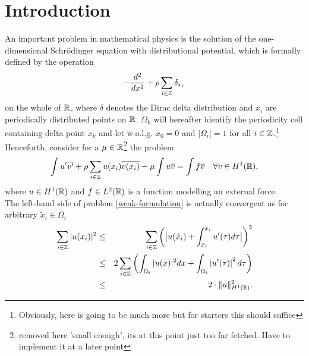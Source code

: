 \chapter{Introduction}

An important problem in mathematical physics is the solution of the one-dimensional Schrödinger equation with distributional potential, which is formally defined by the operation
\begin{equation}
	- \frac{d^{2}}{dx^{2}} + \rho \sum_{i \in \mathbb{Z}} \delta_{x_{i}} \label{the-operator}
\end{equation}
on the whole of $\mathbb{R}$, where $\delta$ denotes the Dirac delta distribution and $x_{i}$ are periodically distributed points on $\mathbb{R}$. $\Omega_{k}$ will hereafter identify the periodicity cell containing delta point $x_{k}$ and let w.o.l.g. $x_{0} = 0$ and $|\Omega_{i}| = 1$ for all $i \in \mathbb{Z}$.\footnote{Obviously, here is going to be much more but for starters this should suffice} \\

Henceforth, consider for a $\mu \in \mathbb{R}$\footnote{removed here 'small enough', its at this point just too far fetched. Have to implement it at a later point} the problem
\begin{equation}
	\int u' \overline{v'} + \rho \sum_{i \in \mathbb{Z}} u(x_{i}) \overline{v(x_{i})} - \mu \int u \overline{v} = \int f \overline{v} \quad \forall v \in H^{1}(\mathbb{R}), \label{weak-formulation}
\end{equation}	
where $u \in H^{1}(\mathbb{R})$ and $f \in L^{2}(\mathbb{R})$ is a function modelling an external force. \\	
The left-hand side of problem \eqref{weak-formulation} is actually convergent as for arbitrary $\tilde{x}_{i} \in \Omega_{i}$
\begin{eqnarray}
	\sum_{i \in \mathbb{Z}} |u(x_{i})|^{2} & \leq & \sum_{i \in \mathbb{Z}} \left( \big| u(\tilde{x}_{i}) + \int_{\tilde{x}_{i}}^{x_{i}} u'( \tau ) d\tau \big| \right)^{2} \notag \\
		 & \leq & 2 \sum_{i \in \mathbb{Z}} \left( \int_{\Omega_{i}} |u( x )|^{2} dx +  \int_{\Omega_{i}} \left| u'(\tau) \right|^{2} d\tau \right) \notag \\
		 & \leq & 2 \cdot \| u \|^{2}_{H^{1}(\mathbb{R})}. \label{eq:potentialestim}
\end{eqnarray}